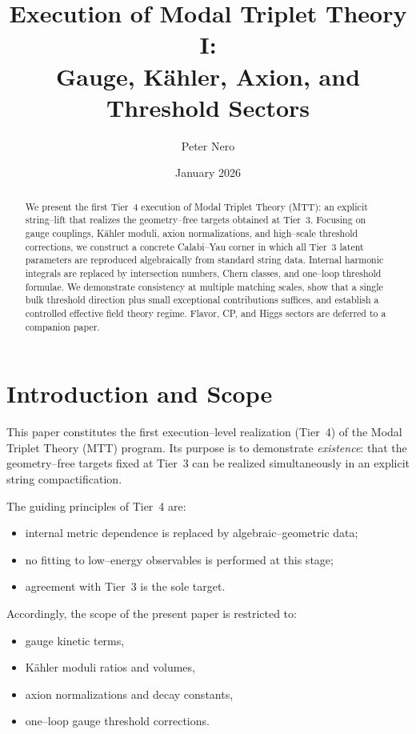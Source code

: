 \documentclass[11pt]{article}
\title{Execution of Modal Triplet Theory I:\\
Gauge, K\"ahler, Axion, and Threshold Sectors}
\author{Peter Nero}
\date{January 2026}
\begin{document}
\maketitle

\begin{abstract}
We present the first Tier~4 execution of Modal Triplet Theory (MTT):
an explicit string--lift that realizes the geometry--free targets
obtained at Tier~3.
Focusing on gauge couplings, K\"ahler moduli, axion normalizations,
and high--scale threshold corrections, we construct a concrete
Calabi--Yau corner in which all Tier~3 latent parameters are reproduced
algebraically from standard string data.
Internal harmonic integrals are replaced by intersection numbers,
Chern classes, and one--loop threshold formulae.
We demonstrate consistency at multiple matching scales, show that a
single bulk threshold direction plus small exceptional contributions
suffices, and establish a controlled effective field theory regime.
Flavor, CP, and Higgs sectors are deferred to a companion paper.
\end{abstract}

\tableofcontents
\newpage

\section{Introduction and Scope}

This paper constitutes the first execution--level realization
(Tier~4) of the Modal Triplet Theory (MTT) program.
Its purpose is to demonstrate \emph{existence}:
that the geometry--free targets fixed at Tier~3 can be realized
simultaneously in an explicit string compactification.

The guiding principles of Tier~4 are:
\begin{itemize}
  \item internal metric dependence is replaced by algebraic--geometric
        data;
  \item no fitting to low--energy observables is performed at this stage;
  \item agreement with Tier~3 is the sole target.
\end{itemize}

Accordingly, the scope of the present paper is restricted to:
\begin{itemize}
  \item gauge kinetic terms,
  \item K\"ahler moduli ratios and volumes,
  \item axion normalizations and decay constants,
  \item one--loop gauge threshold corrections.
\end{itemize}
\end{document}
